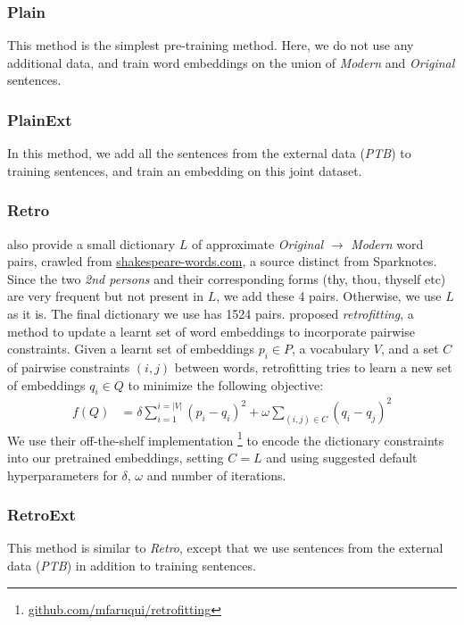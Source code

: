 \subsubsection{Plain}
This method is the simplest pre-training method. Here, we do not use any additional data, and train word embeddings on the union of \textit{Modern} and \textit{Original} sentences. 

\subsubsection{PlainExt}
In this method, we add all the sentences from the external data (\textit{PTB}) to training sentences, and train an embedding on this joint dataset.

\subsubsection{Retro}
\cite{xu2012paraphrasing,xu2014data} also provide a small dictionary $L$ of approximate \textit{Original} $\rightarrow$ \textit{Modern} word pairs, crawled from \url{shakespeare-words.com}, a source distinct from Sparknotes. Since the two \textit{2nd persons} and their corresponding forms (thy, thou, thyself etc) are very frequent but not present in $L$, we add these 4 pairs. Otherwise, we use $L$ as it is. The final dictionary we use has 1524 pairs. \cite{faruqui2014retrofitting} proposed \emph{retrofitting}, a  method to update a learnt set of word embeddings to incorporate pairwise constraints. Given a learnt set of embeddings $p_i \in P$, a vocabulary $V$, and a set $C$ of pairwise constraints $(i,j)$ between words, retrofitting tries to learn a new set of embeddings $q_i \in Q$ to minimize the following objective:
\begin{align*}
    f(Q) & = \delta \sum_{i=1}^{i=|V|} {(p_i-q_i)}^2 + \omega \sum_{(i,j) \in C} {(q_i-q_j)}^2
\end{align*}
We use their off-the-shelf 
implementation \footnote{\url{github.com/mfaruqui/retrofitting}} to encode the dictionary constraints into our pretrained embeddings, setting $C=L$ and using suggested default hyperparameters for $\delta$, $\omega$ and number of iterations.

\subsubsection{RetroExt}
This method is similar to \emph{Retro}, except that we use sentences from the external data (\textit{PTB}) in addition to training sentences.

